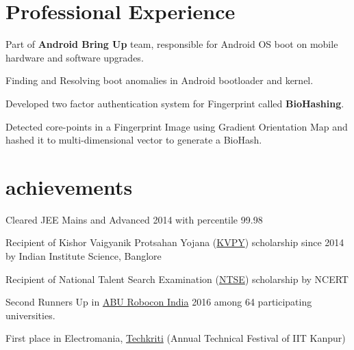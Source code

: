 \documentclass[]{deedy-resume-openfont}
\begin{document}
\begin{minipage}[t]{0.69\textwidth} 

\section{Professional Experience}
\vspace{3.5mm}
\begin{tightemize}
\item Part of \textbf{Android Bring Up} team, responsible for Android OS boot on mobile hardware and software upgrades.
\item Finding and Resolving boot anomalies in Android bootloader and kernel.
\end{tightemize}
\begin{tightemize}
\item Developed two factor authentication system for Fingerprint called \textbf{BioHashing}.
\item Detected core-points in a Fingerprint Image using Gradient Orientation Map and hashed it to multi-dimensional vector to generate a BioHash.
\end{tightemize} 
\section{achievements}
\vspace{2mm}
\begin{tightemize}
	\item Cleared JEE Mains and Advanced 2014 with percentile 99.98
	\item Recipient of Kishor Vaigyanik Protsahan Yojana (\href{http://www.kvpy.iisc.ernet.in/main/index.htm}{KVPY}) scholarship since 2014 by Indian Institute Science, Banglore
	\item Recipient of National Talent Search Examination (\href{http://www.ncert.nic.in/programmes/talent_exam/index_talent.html}{NTSE}) scholarship by NCERT 
	\item Second Runners Up in \href{http://www.roboconindia.com/}{ABU Robocon India} 2016 among 64 participating universities.
	\item First place in Electromania, \href{https://techkriti.org/}{Techkriti} (Annual Technical Festival of IIT Kanpur)
\end{tightemize}


\end{minipage}
\end{document}
